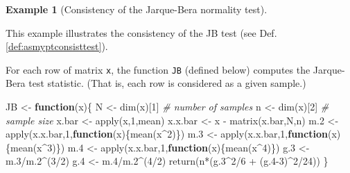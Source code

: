 \documentclass[
  12pt,
]{book}
\newenvironment{Shaded}{\begin{snugshade}}{\end{snugshade}}
\newcommand{\CommentTok}[1]{\textcolor[rgb]{0.56,0.35,0.01}{\textit{#1}}}
\newcommand{\ControlFlowTok}[1]{\textcolor[rgb]{0.13,0.29,0.53}{\textbf{#1}}}
\newcommand{\DecValTok}[1]{\textcolor[rgb]{0.00,0.00,0.81}{#1}}
\newcommand{\FloatTok}[1]{\textcolor[rgb]{0.00,0.00,0.81}{#1}}
\newcommand{\FunctionTok}[1]{\textcolor[rgb]{0.00,0.00,0.00}{#1}}
\newcommand{\NormalTok}[1]{#1}
\newcommand{\OtherTok}[1]{\textcolor[rgb]{0.56,0.35,0.01}{#1}}
\newcommand{\SpecialCharTok}[1]{\textcolor[rgb]{0.00,0.00,0.00}{#1}}
\theoremstyle{definition}
\theoremstyle{definition}
\newtheorem{example}{Example}[chapter]
\theoremstyle{definition}
\theoremstyle{definition}
\theoremstyle{remark}
\begin{document}
\begin{example}[Consistency of the Jarque-Bera normality test]
\protect\hypertarget{exm:JB}{}\label{exm:JB}

This example illustrates the consistency of the JB test (see Def. \ref{def:asmyptconsisttest}).

For each row of matrix \texttt{x}, the function \texttt{JB} (defined below) computes the Jarque-Bera test statistic. (That is, each row is considered as a given sample.)

\begin{Shaded}
\begin{Highlighting}[]
\NormalTok{JB }\OtherTok{\textless{}{-}} \ControlFlowTok{function}\NormalTok{(x)\{}
\NormalTok{  N }\OtherTok{\textless{}{-}} \FunctionTok{dim}\NormalTok{(x)[}\DecValTok{1}\NormalTok{] }\CommentTok{\# number of samples}
\NormalTok{  n }\OtherTok{\textless{}{-}} \FunctionTok{dim}\NormalTok{(x)[}\DecValTok{2}\NormalTok{] }\CommentTok{\# sample size}
\NormalTok{  x.bar }\OtherTok{\textless{}{-}} \FunctionTok{apply}\NormalTok{(x,}\DecValTok{1}\NormalTok{,mean)}
\NormalTok{  x.x.bar }\OtherTok{\textless{}{-}}\NormalTok{ x }\SpecialCharTok{{-}} \FunctionTok{matrix}\NormalTok{(x.bar,N,n)}
\NormalTok{  m}\FloatTok{.2} \OtherTok{\textless{}{-}} \FunctionTok{apply}\NormalTok{(x.x.bar,}\DecValTok{1}\NormalTok{,}\ControlFlowTok{function}\NormalTok{(x)\{}\FunctionTok{mean}\NormalTok{(x}\SpecialCharTok{\^{}}\DecValTok{2}\NormalTok{)\})}
\NormalTok{  m}\FloatTok{.3} \OtherTok{\textless{}{-}} \FunctionTok{apply}\NormalTok{(x.x.bar,}\DecValTok{1}\NormalTok{,}\ControlFlowTok{function}\NormalTok{(x)\{}\FunctionTok{mean}\NormalTok{(x}\SpecialCharTok{\^{}}\DecValTok{3}\NormalTok{)\})}
\NormalTok{  m}\FloatTok{.4} \OtherTok{\textless{}{-}} \FunctionTok{apply}\NormalTok{(x.x.bar,}\DecValTok{1}\NormalTok{,}\ControlFlowTok{function}\NormalTok{(x)\{}\FunctionTok{mean}\NormalTok{(x}\SpecialCharTok{\^{}}\DecValTok{4}\NormalTok{)\})}
\NormalTok{  g}\FloatTok{.3} \OtherTok{\textless{}{-}}\NormalTok{ m}\FloatTok{.3}\SpecialCharTok{/}\NormalTok{m}\FloatTok{.2}\SpecialCharTok{\^{}}\NormalTok{(}\DecValTok{3}\SpecialCharTok{/}\DecValTok{2}\NormalTok{)}
\NormalTok{  g}\FloatTok{.4} \OtherTok{\textless{}{-}}\NormalTok{ m}\FloatTok{.4}\SpecialCharTok{/}\NormalTok{m}\FloatTok{.2}\SpecialCharTok{\^{}}\NormalTok{(}\DecValTok{4}\SpecialCharTok{/}\DecValTok{2}\NormalTok{)}
  \FunctionTok{return}\NormalTok{(n}\SpecialCharTok{*}\NormalTok{(g}\FloatTok{.3}\SpecialCharTok{\^{}}\DecValTok{2}\SpecialCharTok{/}\DecValTok{6} \SpecialCharTok{+}\NormalTok{ (g}\FloatTok{.4}\DecValTok{{-}3}\NormalTok{)}\SpecialCharTok{\^{}}\DecValTok{2}\SpecialCharTok{/}\DecValTok{24}\NormalTok{))}
\NormalTok{\}}
\end{Highlighting}
\end{Shaded}


\end{example}
\end{document}
